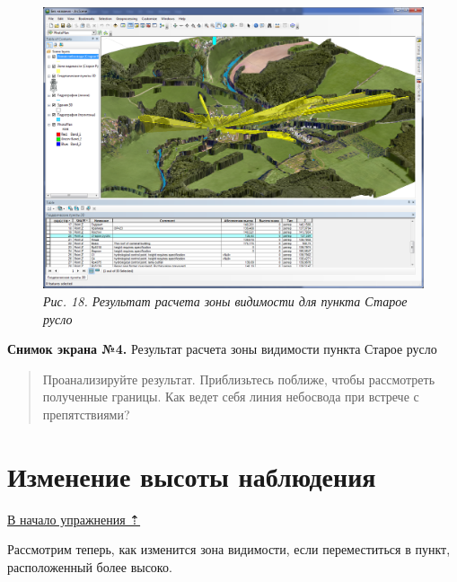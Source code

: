 \documentclass[12pt,]{book}
\begin{document}
\begin{enumerate}
  \begin{figure}
  \centering
  \includegraphics{images/Ex18/image20.png}
  \caption{\emph{Рис. 18. Результат расчета зоны видимости для пункта Старое русло}}
  \end{figure}

  \textbf{Снимок экрана №4.} Результат расчета зоны видимости пункта Старое русло
\end{enumerate}

\begin{quote}
Проанализируйте результат. Приблизьтесь поближе, чтобы рассмотреть полученные границы. Как ведет себя линия небосвода при встрече с препятствиями?
\end{quote}

\hypertarget{threed-modelling-height}{%
\section{Изменение высоты наблюдения}\label{threed-modelling-height}}

\protect\hyperlink{threed-modelling}{В начало упражнения ⇡}

Рассмотрим теперь, как изменится зона видимости, если переместиться в пункт, расположенный более высоко.
\end{document}
